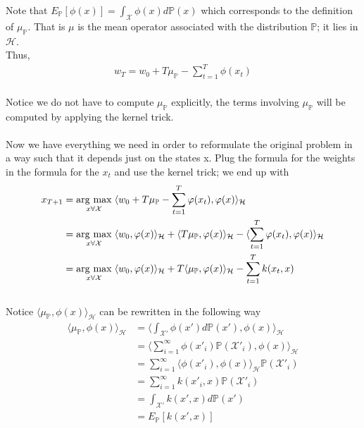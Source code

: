Note that
$E_{\mathbb{P}}[\phi(x)]=\int_{\mathcal{X}}\phi(x)d\mathbb{P}(x)$ which corresponds to the definition of $\mu_\mathbb{P}$. 
That is $\mu$ is the mean operator associated with the distribution $\mathbb{P}$; it lies in $\mathcal{H}$.
\\
Thus,
\begin{align*}
   w_{T}= w_{0}+T\mu_{\mathbb{P}}-\sum\limits_{t=1}^{T}\phi(x_{t})
\end{align*}
\\
Notice we do not have to compute $\mu_{\mathbb{P}}$  explicitly, the terms involving $\mu_{\mathbb  {P}}$ will be computed by applying the kernel trick.
\\
\\
Now we have everything we need in order to reformulate the original problem in a way such that it depends just on the states x.
Plug the formula for the weights in the formula for the $x_{t}$ and use the kernel trick; we end up with
\\
\begin{align*}
    x_{T+1} &=\underset{x\forall \mathcal{X}}{\operatorname{arg}\,\operatorname{max}}\;\langle w_{0}+T\mu_{\mathbb{P}}-\sum\limits_{t=1}^{T}\varphi(x_{t}),\varphi(x)\rangle_{\mathcal{H}} \\
&=\underset{x\forall \mathcal{X}}{\operatorname{arg}\,\operatorname{max}}\;\langle w_{0},\varphi(x)\rangle_{\mathcal{H}}
+\langle T\mu_{\mathbb{P}},\varphi(x)\rangle_{\mathcal{H}}
-\langle \sum\limits_{t=1}^{T}\varphi(x_{t}),\varphi(x)\rangle_{\mathcal{H}}
\\
&=\underset{x\forall \mathcal{X}}{\operatorname{arg}\,\operatorname{max}}\;\langle w_{0},\varphi(x)\rangle_{\mathcal{H}}
+T\langle \mu_{\mathbb{P}},\varphi(x)\rangle_{\mathcal{H}}
- \sum\limits_{t=1}^{T}k(x_{t}, x)
\end{align*}
\\
Notice $\langle \mu_{\mathbb{P}},\phi(x)\rangle_{\mathcal{H}}$ can be rewritten in the following way
\\
\begin{align*}
\langle \mu_{\mathbb{P}},\phi(x)\rangle_{\mathcal{H}}&=
\langle \int_{\mathcal{X'}}\phi(x')d\mathbb{P}(x'),\phi(x)\rangle_{\mathcal{H}}
\\
&=
\langle  \sum\limits_{i=1}^{\infty}\phi(x'_{i})\mathbb{P}(\mathcal{X'}_{i}),\phi(x)\rangle_{\mathcal{H}}
\\
&=
\sum\limits_{i=1}^{\infty}\langle \phi(x'_{i}),\phi(x)\rangle_{\mathcal{H}} \mathbb{P}(\mathcal{X'}_{i})
\\
&=
\sum\limits_{i=1}^{\infty}k(x'_{i},x) \mathbb{P}(\mathcal{X'}_{i})
\\
&=
\int_{\mathcal{X'}}k(x',x)d\mathbb{P}(x')
\\
&=
E_{\mathbb{P}}[k(x',x)]
\end{align*}

